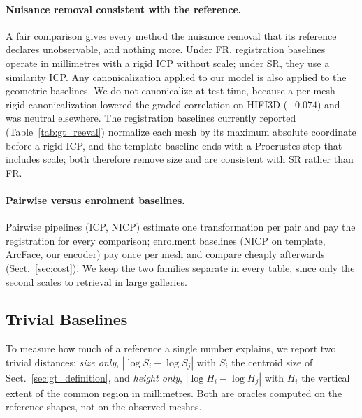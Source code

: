 \paragraph{Nuisance removal consistent with the reference.}
A fair comparison gives every method the nuisance removal that its reference
declares unobservable, and nothing more. Under FR, registration baselines
operate in millimetres with a rigid ICP without scale; under SR, they use a
similarity ICP. Any canonicalization applied to our model is also applied to
the geometric baselines. We do not canonicalize at test time, because a
per-mesh rigid canonicalization lowered the graded correlation on HIFI3D
($-0.074$) and was neutral elsewhere.
The registration baselines currently reported (Table~\ref{tab:gt_reeval})
normalize each mesh by its maximum absolute coordinate before a rigid ICP,
and the template baseline ends with a Procrustes step that includes scale;
both therefore remove size and are consistent with SR rather than FR.

\paragraph{Pairwise versus enrolment baselines.}
Pairwise pipelines (ICP, NICP) estimate one transformation per pair and pay
the registration for every comparison; enrolment baselines (NICP on
template, ArcFace, our encoder) pay once per mesh and compare cheaply
afterwards (Sect.~\ref{sec:cost}). We keep the two families separate in every
table, since only the second scales to retrieval in large galleries.

\subsection{Trivial Baselines}
\label{sec:trivial_baselines}

To measure how much of a reference a single number explains, we report two
trivial distances: \emph{size only}, $|\log S_i-\log S_j|$ with $S_i$ the
centroid size of Sect.~\ref{sec:gt_definition}, and \emph{height only},
$|\log H_i-\log H_j|$ with $H_i$ the vertical extent of the common region in
millimetres.
Both are oracles computed on the reference shapes, not on the observed
meshes.

